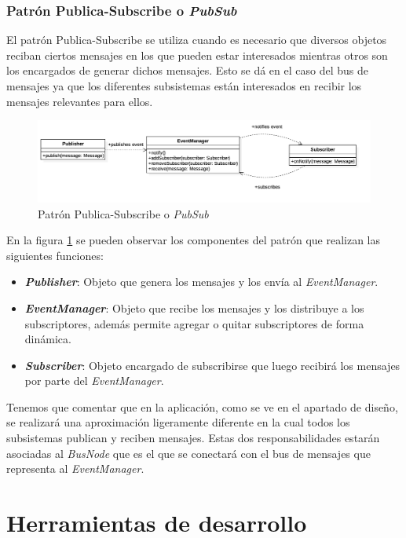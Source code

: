 \subsubsection{Patrón Publica-Subscribe o \textit{PubSub}}

El patrón Publica-Subscribe se utiliza cuando es necesario que diversos objetos reciban ciertos mensajes en los que pueden estar interesados mientras otros son los encargados de generar dichos mensajes. Esto se dá en el caso del  bus de mensajes ya que los diferentes subsistemas están interesados en recibir los mensajes relevantes para ellos.

\bigskip

\begin{figure}
	\centerline{\includegraphics[width=12cm]{otros/UML/png/pubsub.png}}
	\caption{Patrón Publica-Subscribe o \textit{PubSub}}
		\label{pat:pubsub}
\end{figure}

\bigskip
 
En la figura \ref{pat:pubsub} se pueden observar los componentes del patrón que realizan las siguientes funciones:

\begin{itemize}
	\item \textbf{\textit{Publisher}}: Objeto que genera los mensajes y los envía al \textit{EventManager}.
	\item \textbf{\textit{EventManager}}: Objeto que recibe los mensajes y los distribuye a los subscriptores, además permite agregar o quitar subscriptores de forma dinámica.
	\item \textbf{\textit{Subscriber}}: Objeto encargado de subscribirse que luego recibirá los mensajes por parte del \textit{EventManager}.
\end{itemize}

\bigskip

Tenemos que comentar que en la aplicación, como se ve en el apartado de diseño, se realizará una aproximación ligeramente diferente en la cual todos los subsistemas publican y reciben mensajes. Estas dos responsabilidades estarán asociadas al \textit{BusNode} que es el que se conectará con el bus de mensajes que representa al \textit{EventManager}.


\section{Herramientas de desarrollo}

